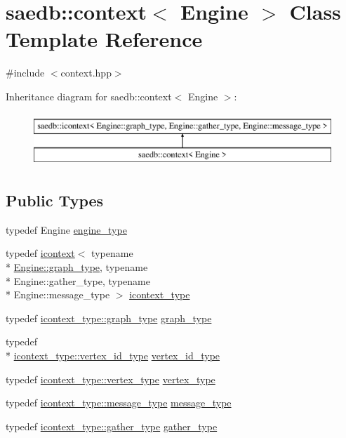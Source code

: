 \hypertarget{classsaedb_1_1context}{\section{saedb\-:\-:context$<$ Engine $>$ Class Template Reference}
\label{d1/d89/classsaedb_1_1context}
}


{\ttfamily \#include $<$context.\-hpp$>$}

Inheritance diagram for saedb\-:\-:context$<$ Engine $>$\-:\begin{figure}[H]
\begin{center}
\leavevmode
\includegraphics[height=2.000000cm]{d1/d89/classsaedb_1_1context}
\end{center}
\end{figure}
\subsection*{Public Types}
\begin{DoxyCompactItemize}
\item 
typedef Engine \hyperlink{classsaedb_1_1context_a10f237a9463e78f60b333d7017cbf948}{engine\-\_\-type}
\item 
typedef \hyperlink{classsaedb_1_1icontext}{icontext}$<$ typename \\*
\hyperlink{demo_2pagerank_2pagerank_8cpp_afa42a4da0de8450a5bb4145aa06ee689}{Engine\-::graph\-\_\-type}, typename \\*
Engine\-::gather\-\_\-type, typename \\*
Engine\-::message\-\_\-type $>$ \hyperlink{classsaedb_1_1context_ae9df8581f3061e5caa9272039d969b18}{icontext\-\_\-type}
\item 
typedef \hyperlink{classsaedb_1_1icontext_a8eeb99ff6eb90e3f096a2895f9b92653}{icontext\-\_\-type\-::graph\-\_\-type} \hyperlink{classsaedb_1_1context_af74463841aa837f915f43fce2ca64dca}{graph\-\_\-type}
\item 
typedef \\*
\hyperlink{classsaedb_1_1icontext_ac130cf374063f27748e4770617971660}{icontext\-\_\-type\-::vertex\-\_\-id\-\_\-type} \hyperlink{classsaedb_1_1context_aba9540d1189edf19f3d1cb7363b5c40b}{vertex\-\_\-id\-\_\-type}
\item 
typedef \hyperlink{classsaedb_1_1icontext_ab83a38ba860cb2101b499ae60675e4e5}{icontext\-\_\-type\-::vertex\-\_\-type} \hyperlink{classsaedb_1_1context_a62f418b2b73082cd65a88feb604bab9f}{vertex\-\_\-type}
\item 
typedef \hyperlink{classsaedb_1_1icontext_a7bd82d8486ab08dc1adf49dd6d659059}{icontext\-\_\-type\-::message\-\_\-type} \hyperlink{classsaedb_1_1context_ad29784e44db80b03b0adab9a2d8f2c72}{message\-\_\-type}
\item 
typedef \hyperlink{classsaedb_1_1icontext_a7c3ae1019b418faf3de68ab9396f867b}{icontext\-\_\-type\-::gather\-\_\-type} \hyperlink{classsaedb_1_1context_acce022e81537ee830f3df623f4f9e0d4}{gather\-\_\-type}
\end{DoxyCompactItemize}
